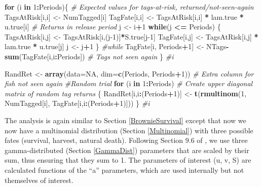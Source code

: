 \documentclass[
]{krantz}
\makeatletter
\newenvironment{Shaded}{\begin{snugshade}}{\end{snugshade}}
\newcommand{\AttributeTok}[1]{\textcolor[rgb]{0.27,0.27,0.27}{#1}}
\newcommand{\CommentTok}[1]{\textcolor[rgb]{0.37,0.37,0.37}{\textit{#1}}}
\newcommand{\ConstantTok}[1]{\textcolor[rgb]{0.37,0.37,0.37}{#1}}
\newcommand{\ControlFlowTok}[1]{\textcolor[rgb]{0.27,0.27,0.27}{\textbf{#1}}}
\newcommand{\DecValTok}[1]{\textcolor[rgb]{0.06,0.06,0.06}{#1}}
\newcommand{\FunctionTok}[1]{\textcolor[rgb]{0.27,0.27,0.27}{\textbf{#1}}}
\newcommand{\NormalTok}[1]{#1}
\newcommand{\OtherTok}[1]{\textcolor[rgb]{0.37,0.37,0.37}{#1}}
\newcommand{\SpecialCharTok}[1]{\textcolor[rgb]{0.43,0.43,0.43}{\textbf{#1}}}
\newenvironment{kframe}{%
\medskip{}
\setlength{\fboxsep}{.8em}
 \def\at@end@of@kframe{}%
 \ifinner\ifhmode%
  \def\at@end@of@kframe{\end{minipage}}%
  \begin{minipage}{\columnwidth}%
 \fi\fi%
 \def\FrameCommand##1{\hskip\@totalleftmargin \hskip-\fboxsep
 \colorbox{shadecolor}{##1}\hskip-\fboxsep
     \hskip-\linewidth \hskip-\@totalleftmargin \hskip\columnwidth}%
 \MakeFramed {\advance\hsize-\width
   \@totalleftmargin\z@ \linewidth\hsize
   \@setminipage}}%
 {\par\unskip\endMakeFramed%
 \at@end@of@kframe}
\renewenvironment{Shaded}{\begin{kframe}}{\end{kframe}}
\makeatother
\begin{document}
\begin{Shaded}
\begin{Highlighting}[]
\ControlFlowTok{for}\NormalTok{ (i }\ControlFlowTok{in} \DecValTok{1}\SpecialCharTok{:}\NormalTok{Periods)\{ }
\CommentTok{\# Expected values for tags{-}at{-}risk, returned/not{-}seen{-}again}
\NormalTok{  TagsAtRisk[i,i] }\OtherTok{\textless{}{-}}\NormalTok{ NumTagged[i]}
\NormalTok{  TagFate[i,i] }\OtherTok{\textless{}{-}}\NormalTok{  TagsAtRisk[i,i] }\SpecialCharTok{*}\NormalTok{ lam.true }\SpecialCharTok{*}\NormalTok{ u.true[i] }
   \CommentTok{\# Returns in release period}
\NormalTok{  j }\OtherTok{\textless{}{-}}\NormalTok{ i}\SpecialCharTok{+}\DecValTok{1}
  \ControlFlowTok{while}\NormalTok{(j }\SpecialCharTok{\textless{}=}\NormalTok{ Periods) \{}
\NormalTok{    TagsAtRisk[i,j] }\OtherTok{\textless{}{-}}\NormalTok{ TagsAtRisk[i,(j}\DecValTok{{-}1}\NormalTok{)]}\SpecialCharTok{*}\NormalTok{S.true[j}\DecValTok{{-}1}\NormalTok{]}
\NormalTok{    TagFate[i,j] }\OtherTok{\textless{}{-}}\NormalTok{ TagsAtRisk[i,j] }\SpecialCharTok{*}\NormalTok{ lam.true }\SpecialCharTok{*}\NormalTok{ u.true[j]}
\NormalTok{    j }\OtherTok{\textless{}{-}}\NormalTok{ j}\SpecialCharTok{+}\DecValTok{1}
\NormalTok{   \} }\CommentTok{\#while}
\NormalTok{  TagFate[i, Periods}\SpecialCharTok{+}\DecValTok{1}\NormalTok{] }\OtherTok{\textless{}{-}}\NormalTok{ NTags}\SpecialCharTok{{-}}\FunctionTok{sum}\NormalTok{(TagFate[i,i}\SpecialCharTok{:}\NormalTok{Periods]) }\CommentTok{\# Tags not seen again}
\NormalTok{  \} }\CommentTok{\#i}

\NormalTok{RandRet }\OtherTok{\textless{}{-}} \FunctionTok{array}\NormalTok{(}\AttributeTok{data=}\ConstantTok{NA}\NormalTok{, }\AttributeTok{dim=}\FunctionTok{c}\NormalTok{(Periods, Periods}\SpecialCharTok{+}\DecValTok{1}\NormalTok{))  }
  \CommentTok{\# Extra column for fish not seen again}
\CommentTok{\#Random trial}
  \ControlFlowTok{for}\NormalTok{ (i }\ControlFlowTok{in} \DecValTok{1}\SpecialCharTok{:}\NormalTok{Periods) }\CommentTok{\# Create upper diagonal matrix of random tag returns}
\NormalTok{  \{}
\NormalTok{    RandRet[i,i}\SpecialCharTok{:}\NormalTok{(Periods}\SpecialCharTok{+}\DecValTok{1}\NormalTok{)] }\OtherTok{\textless{}{-}} \FunctionTok{t}\NormalTok{(}\FunctionTok{rmultinom}\NormalTok{(}\DecValTok{1}\NormalTok{, NumTagged[i], }
\NormalTok{                                        TagFate[i,i}\SpecialCharTok{:}\NormalTok{(Periods}\SpecialCharTok{+}\DecValTok{1}\NormalTok{)]))}
\NormalTok{  \} }\CommentTok{\#i}
\end{Highlighting}
\end{Shaded}

The analysis is again similar to Section \ref{BrownieSurvival} except that now we now have a multinomial distribution (Section \ref{Multinomial}) with three possible fates (survival, harvest, natural death). Following Section 9.6 of \citet{kéry.schaub_2011}, we use three gamma-distributed (Section \ref{GammaDist}) parameters that are scaled by their sum, thus ensuring that they sum to 1. The parameters of interest (u, v, S) are calculated functions of the ``a'' parameters, which are used internally but not themselves of interest.
\end{document}
